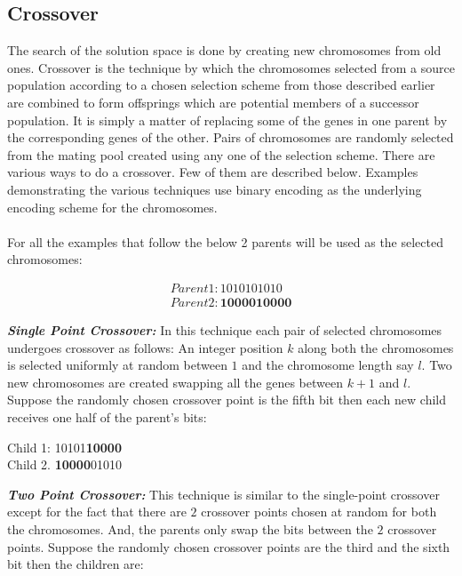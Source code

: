 \documentclass[a4paper, 12pt]{article}
\begin{document}
\subsection{Crossover}
The search of the solution space is done by creating new chromosomes from old ones. Crossover is the technique by which the chromosomes 
selected from a source population according to a chosen selection scheme from those described earlier are combined to form offsprings which are potential members of a successor population. It is simply a matter of replacing some of the genes in one parent by the corresponding genes of the other. Pairs of chromosomes are randomly selected from the mating pool created using any one of the selection scheme. There are various ways to do a crossover. Few of them are described below. Examples demonstrating the various techniques use binary encoding as the underlying encoding scheme for the chromosomes.\\~\\
For all the examples that follow the below 2 parents will be used as the selected chromosomes:
\begin{center}
\begin{align*}
Parent 1: 1010101010\\
Parent 2: \textbf{1000010000}
\end{align*}
\end{center}
\textbf{\textit{Single Point Crossover: }}
In this technique each pair of selected chromosomes undergoes crossover as follows: An integer position $k$ along both the chromosomes is 
selected uniformly at random between $1$ and the chromosome length say $l$. Two new chromosomes are created swapping all the genes between $k+1$ and $l$. Suppose the randomly chosen crossover point is the fifth bit then each new child receives one half of the parent's bits:
\begin{center}
Child 1: 10101\textbf{10000}\\
Child 2. \textbf{10000}01010
\end{center}
\textbf{\textit{Two Point Crossover: }}
This technique is similar to the single-point crossover except for the fact that there are $2$ crossover points chosen at random for both the
chromosomes. And, the parents only swap the bits between the $2$ crossover points. Suppose the randomly chosen crossover points are the third 
and the sixth bit then the children are:
\end{document}
